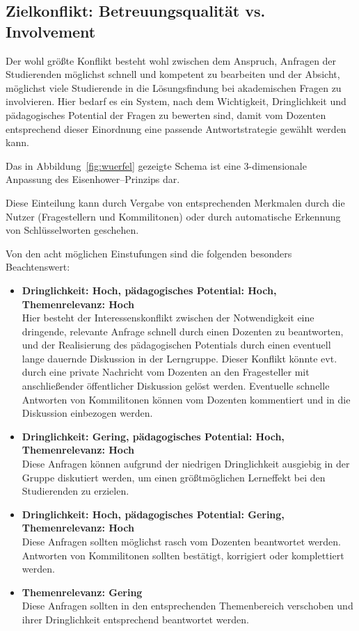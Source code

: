 \subsection{Zielkonflikt: Betreuungsqualität vs. Involvement} %
\label{sub:zielkonflikt_betreuungsqualitat_vs_involvement}
Der wohl größte Konflikt besteht wohl zwischen dem Anspruch, Anfragen der Studierenden möglichst schnell und kompetent zu bearbeiten und der Absicht, möglichst viele Studierende in die Lösungsfindung bei akademischen Fragen zu involvieren. Hier bedarf es ein System, nach dem Wichtigkeit, Dringlichkeit und pädagogisches Potential der Fragen zu bewerten sind, damit vom Dozenten entsprechend dieser Einordnung eine passende Antwortstrategie gewählt werden kann. 

Das in Abbildung~\ref{fig:wuerfel} gezeigte Schema ist eine 3-dimensionale Anpassung des Eisenhower–Prinzips dar.


Diese Einteilung kann durch Vergabe von entsprechenden Merkmalen durch die Nutzer (Fragestellern und Kommilitonen) oder durch automatische Erkennung von Schlüsselworten geschehen.

Von den acht möglichen Einstufungen sind die folgenden besonders Beachtenswert:

\begin{itemize}
	\item \textbf{Dringlichkeit: Hoch, pädagogisches Potential: Hoch, Themenrelevanz: Hoch}\\
				Hier besteht der Interessenskonflikt zwischen der Notwendigkeit eine dringende, relevante Anfrage schnell durch einen Dozenten zu beantworten, 
				und der Realisierung des pädagogischen Potentials durch einen eventuell lange dauernde Diskussion in der Lerngruppe. 
				Dieser Konflikt könnte evt. durch eine private Nachricht vom Dozenten an den Fragesteller mit anschließender öffentlicher Diskussion gelöst werden.
				Eventuelle schnelle Antworten von Kommilitonen können vom Dozenten kommentiert und in die Diskussion einbezogen werden.
				
	\item \textbf{Dringlichkeit: Gering, pädagogisches Potential: Hoch, Themenrelevanz: Hoch}\\
				Diese Anfragen können aufgrund der niedrigen Dringlichkeit ausgiebig in der Gruppe diskutiert werden, um einen größtmöglichen Lerneffekt bei den Studierenden zu erzielen.
				
	\item \textbf{Dringlichkeit: Hoch, pädagogisches Potential: Gering, Themenrelevanz: Hoch}\\
				Diese Anfragen sollten möglichst rasch vom Dozenten beantwortet werden. Antworten von Kommilitonen sollten bestätigt, korrigiert oder komplettiert werden.
				
	\item \textbf{Themenrelevanz: Gering}\\
				Diese Anfragen sollten in den entsprechenden Themenbereich verschoben und ihrer Dringlichkeit entsprechend beantwortet werden.
\end{itemize}

